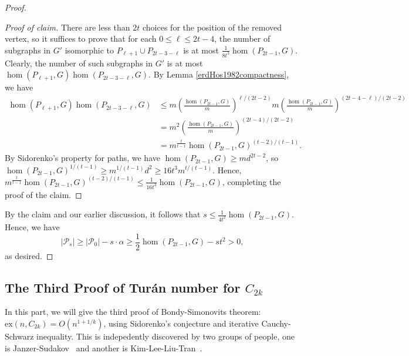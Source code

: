 \documentclass{article}
\theoremstyle{definition}
\newcommand{\ex}{\mathrm{ex}}
\newenvironment{poc}{\begin{proof}[Proof of claim]\renewcommand*{\qedsymbol}{$\blacksquare$}}{\end{proof}}
\def\Turan{Tur\'an}
\begin{document}
\begin{proof}
\begin{poc}
 There are less than $2t$ choices for the position of the removed vertex, so it suffices to prove that for each $0\leq \ell\leq 2t-4$, the number of subgraphs in $G'$ isomorphic to $P_{\ell+1}\cup P_{2t-3-\ell}$ is at most $\frac{1}{8t^3}\hom(P_{2t-1},G)$. Clearly, the number of such subgraphs in $G'$ is at most $\hom(P_{\ell+1},G)\hom(P_{2t-3-\ell},G)$. By Lemma \ref{erdHos1982compactness}, we have
    \begin{align*}
        \hom(P_{\ell+1},G)\hom(P_{2t-3-\ell},G)
        &\leq m\left(\frac{\hom(P_{2t-1},G)}{m}\right)^{\ell/(2t-2)}m\left(\frac{\hom(P_{2t-1},G)}{m}\right)^{(2t-4-\ell)/(2t-2)} \\
        &=m^2\left(\frac{\hom(P_{2t-1},G)}{m}\right)^{(2t-4)/(2t-2)} \\
        &=m^{\frac{t}{t-1}}\hom(P_{2t-1},G)^{(t-2)/(t-1)}.
    \end{align*}
    By Sidorenko's property for paths, we have $\hom(P_{2t-1},G)\geq md^{2t-2}$, so $\hom(P_{2t-1},G)^{1/(t-1)}\geq m^{1/(t-1)}d^2\geq 16t^3m^{t/(t-1)}$. Hence, $m^{\frac{t}{t-1}}\hom(P_{2t-1},G)^{(t-2)/(t-1)}\leq \frac{1}{16t^3}\hom(P_{2t-1},G)$, completing the proof of the claim.   
\end{poc}
    By the claim and our earlier discussion, it follows that $s\leq \frac{1}{4t^2}\hom(P_{2t-1},G)$.
    Hence, we have 
    \begin{equation*}
        |\mathcal{P}_{s}| \ge |\mathcal{P}_0|-s\cdot \alpha \ge  \frac{1}{2}\hom(P_{2t-1},G)-  st^2 >0,
    \end{equation*}
     as desired.
\end{proof}

\subsection{The Third Proof of \Turan{} number for $C_{2k}$}

In this part, we will give the third proof of Bondy-Simonovits theorem: $\ex(n,C_{2k})=O(n^{1+1/k})$, using Sidorenko's conjecture and iterative Cauchy-Schwarz inequality. This is indepedently discovered by two groups of people, one is Janzer-Sudakov~\cite{janzer2024turan} and another is Kim-Lee-Liu-Tran~\cite{kim2022rainbow}.
\end{document}
